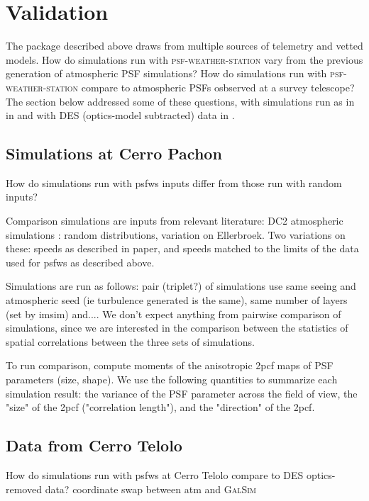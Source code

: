 \documentclass[twocolumn]{aastex631}
\newcommand{\psfws}{\textsc{psf-weather-station}\xspace}
\newcommand{\galsim}{\textsc{GalSim}\xspace}
\begin{document}
\section{Validation} \label{sec:valid}
The package described above draws from multiple sources of telemetry and vetted models. 
How do simulations run with \psfws vary from the previous generation of atmospheric PSF simulations? 
How do simulations run with \psfws compare to atmospheric PSFs osbserved at a survey telescope?
The section below addressed some of these questions, with simulations run as in  in  and with DES (optics-model subtracted) data in .

\subsection{Simulations at Cerro Pachon}\label{sec:imsimcompare}
How do simulations run with psfws inputs differ from those run with random inputs?

Comparison simulations are inputs from relevant literature: DC2 atmospheric simulations : random distributions, variation on Ellerbroek.
Two variations on these: speeds as described in paper, and speeds matched to the limits of the data used for psfws as described above.

Simulations are run as follows:
pair (triplet?) of simulations use same seeing and atmospheric seed (ie turbulence generated is the same), same number of layers (set by imsim) and.... 
We don't expect anything from pairwise comparison of simulations, since we are interested in the comparison between the statistics of spatial correlations between the three sets of simulations.

To run comparison, compute moments of the anisotropic 2pcf maps of PSF parameters (size, shape). 
We use the following quantities to summarize each simulation result: the variance of the PSF parameter across the field of view, the "size" of the 2pcf ("correlation length"), and the "direction" of the 2pcf. 


\subsection{Data from Cerro Telolo} \label{sec:descompare}
How do simulations run with psfws at Cerro Telolo compare to DES optics-removed data?
coordinate swap between atm and \galsim
\end{document}
